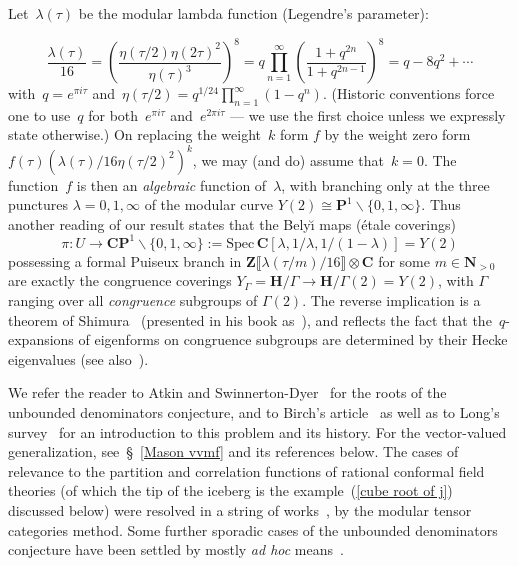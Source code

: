 \documentclass[10pt]{amsart}
\def\NwithoutzeroA{\mathbf{N}_{> 0}}
\def\SSS{\S}
\def\SSSS{\S}
\renewcommand\setminus{\smallsetminus}
\def\Z{\mathbf{Z}}
\renewcommand\mathbb{\mathbf}
\theoremstyle{remark}
\numberwithin{equation}{subsection}
\def\numequation{\addtocounter{subsubsection}{1}\begin{equation}}
\def\C{\mathbf{C}}
\def\H{\mathbf{H}}
\begin{document}
Let~$\lambda(\tau)$ be the modular lambda function (Legendre's parameter):
\numequation \label{Legendre}
\frac{\lambda(\tau)}{16} =
\left( \frac{\eta(\tau/2) \eta(2 \tau)^2}{\eta(\tau)^3} \right)^8 =
q \prod_{n=1}^{\infty} \left( \frac{1 + q^{2n}}{1 + q^{2n-1}} \right)^8 = q -8 q^2 + \cdots 
\end{equation}
with~$q = e^{\pi i \tau}$ and~$\eta(\tau/2) = q^{1/24} \prod_{n=1}^{\infty} (1 - q^n)$. (Historic conventions force one to use~$q$ for both~$e^{\pi i \tau}$ and~$e^{2 \pi i \tau}$ --- we use the first
choice unless we expressly state otherwise.)  On replacing the weight~$k$ form $f$ by the 
weight zero form $f(\tau)(\lambda(\tau)/16\eta(\tau/2)^2)^k$,
we may (and do) assume that~$k=0$. The function~$f$ is then an \emph{algebraic} function of~$\lambda$, with branching only at the three punctures $\lambda = 0, 1, \infty$ of the modular curve $Y(2) \cong \mathbb{P}^1 \setminus \{0, 1, \infty\}$. Thus another reading of our result states that the Bely\u{\i} maps (\'etale coverings) 
$$
\pi  : U \to \mathbb{CP}^1 \setminus \{0, 1, \infty\} := \mathrm{Spec} \, \C[\lambda, 1/\lambda, 1/(1-\lambda)]  = Y(2)
$$
possessing a formal Puiseux branch in $\Z\llbracket  \lambda(\tau/m)/16 \rrbracket \otimes \C$ for some $m \in \NwithoutzeroA$ are exactly the congruence  coverings $Y_{\Gamma} = \H / \Gamma \to \H / \Gamma(2) = Y(2)$, with $\Gamma$ ranging over all \emph{congruence} subgroups of $\Gamma(2)$.
The reverse implication is a theorem of Shimura~\cite{ShimuraEichler} (presented in his book as~\cite[Theorem~3.52]{Shimura}), and reflects the fact that the~$q$-expansions of eigenforms
on congruence subgroups are determined by their Hecke eigenvalues (see also~\cite[\SSS~1.2]{Katz349}). 

We refer the reader to Atkin and Swinnerton-Dyer~\cite{ASD} for the roots of the unbounded denominators conjecture, and to Birch's article~\cite{Birch} as well as to Long's survey~\cite[\SSS~5]{Long} for an introduction to this problem and its history. For the vector-valued generalization, see~\SSSS~\ref{Mason vvmf} and its references below.  The cases of  relevance to the partition and correlation functions of rational
conformal field theories (of which the tip of the iceberg is the example~(\ref{cube root of j}) discussed below)
were resolved in a string of works~\cite{DongRen, DongLinNg, SommerhauserZhu, NgSchauenburg, Xu, Bantay, Zhu, AndersonMoore}, by the modular tensor categories method. Some further sporadic cases of the unbounded denominators conjecture have been settled by mostly {\it ad hoc} means~\cite{FioriFranc, FrancMason, LiLong, KL1, KL2}.
\end{document}
